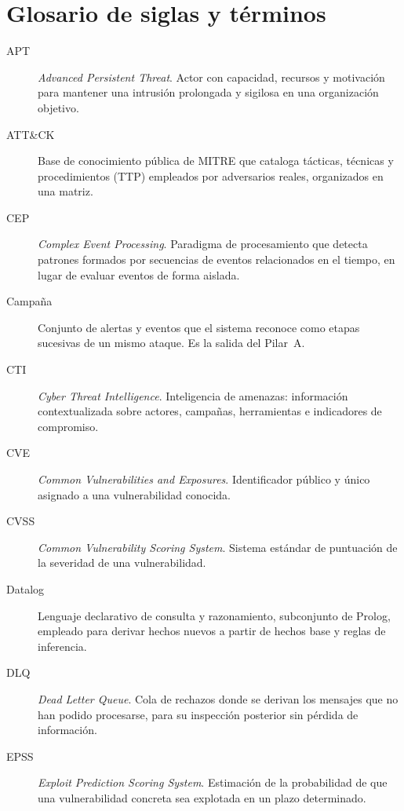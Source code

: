 \chapter*{Glosario de siglas y términos}

\begin{description}

\item[APT] \textit{Advanced Persistent Threat}. Actor con capacidad, recursos y motivación
para mantener una intrusión prolongada y sigilosa en una organización objetivo.

\item[ATT\&CK] Base de conocimiento pública de MITRE que cataloga tácticas, técnicas y
procedimientos (TTP) empleados por adversarios reales, organizados en una matriz.

\item[CEP] \textit{Complex Event Processing}. Paradigma de procesamiento que detecta
patrones formados por secuencias de eventos relacionados en el tiempo, en lugar de evaluar
eventos de forma aislada.

\item[Campaña] Conjunto de alertas y eventos que el sistema reconoce como etapas sucesivas de
un mismo ataque. Es la salida del Pilar~A.

\item[CTI] \textit{Cyber Threat Intelligence}. Inteligencia de amenazas: información
contextualizada sobre actores, campañas, herramientas e indicadores de compromiso.

\item[CVE] \textit{Common Vulnerabilities and Exposures}. Identificador público y único
asignado a una vulnerabilidad conocida.

\item[CVSS] \textit{Common Vulnerability Scoring System}. Sistema estándar de puntuación de
la severidad de una vulnerabilidad.

\item[Datalog] Lenguaje declarativo de consulta y razonamiento, subconjunto de Prolog,
empleado para derivar hechos nuevos a partir de hechos base y reglas de inferencia.

\item[DLQ] \textit{Dead Letter Queue}. Cola de rechazos donde se derivan los mensajes que
no han podido procesarse, para su inspección posterior sin pérdida de información.

\item[EPSS] \textit{Exploit Prediction Scoring System}. Estimación de la probabilidad de
que una vulnerabilidad concreta sea explotada en un plazo determinado.


\end{description}

